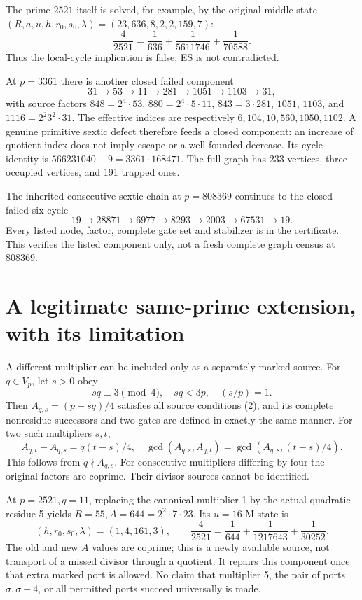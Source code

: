 The prime $2521$ itself is solved, for example, by the original middle state
$(R,a,u,h,r_0,s_0,\lambda)=(23,636,8,2,2,159,7)$:
\[
 \frac4{2521}=\frac1{636}+\frac1{5611746}+\frac1{70588}.    \tag{29}
\]
Thus the local-cycle implication is false; ES is not contradicted.

At $p=3361$ there is another closed failed component
\[
 31\to53\to11\to281\to1051\to1103\to31,                 \tag{30}
\]
with source factors $848=2^4\cdot53$, $880=2^4\cdot5\cdot11$,
$843=3\cdot281$, $1051$, $1103$, and $1116=2^2 3^2\cdot31$.
The effective indices are respectively $6,104,10,560,1050,1102$.
A genuine primitive sextic defect therefore feeds a closed component: an
increase of quotient index does not imply escape or a well-founded decrease.
Its cycle identity is $566231040-9=3361\cdot168471$.
The full graph has 233 vertices, three occupied vertices, and 191 trapped ones.

The inherited consecutive sextic chain at $p=808369$ \cite[\S4]{BryanChain}
continues to the closed failed six-cycle
\[
 19\to28871\to6977\to8293\to2003\to67531\to19.           \tag{31}
\]
Every listed node, factor, complete gate set and stabilizer is in the certificate.
This verifies the listed component only, not a fresh complete graph census at
$808369$.

\section{A legitimate same-prime extension, with its limitation}
A different multiplier can be included only as a separately marked source.
For $q\in V_p$, let $s>0$ obey
\[
 sq\equiv3\pmod4,\quad sq<3p,\quad(s/p)=1.
\]
Then $A_{q,s}=(p+sq)/4$ satisfies all source conditions (2), and its complete
nonresidue successors and two gates are defined in exactly the same manner.
For two such multipliers $s,t$,
\[
 A_{q,t}-A_{q,s}=q(t-s)/4,\quad
 \boxed{\gcd(A_{q,s},A_{q,t})=\gcd(A_{q,s},(t-s)/4).}      \tag{32}
\]
This follows from $q\nmid A_{q,s}$. For consecutive multipliers differing by
four the original factors are coprime. Their divisor sources cannot be identified.

At $p=2521,q=11$, replacing the canonical multiplier 1 by the actual quadratic
residue 5 yields $R=55,A=644=2^2\cdot7\cdot23$. Its $u=16$ M state is
\[
 (h,r_0,s_0,\lambda)=(1,4,161,3),\qquad
 \boxed{\frac4{2521}=\frac1{644}+\frac1{1217643}+\frac1{30252}.} \tag{33}
\]
The old and new $A$ values are coprime; this is a newly available source, not
transport of a missed divisor through a quotient. It repairs this component
once that extra marked port is allowed. No claim that multiplier 5, the pair
of ports $\sigma,\sigma+4$, or all permitted ports succeed universally is made.

